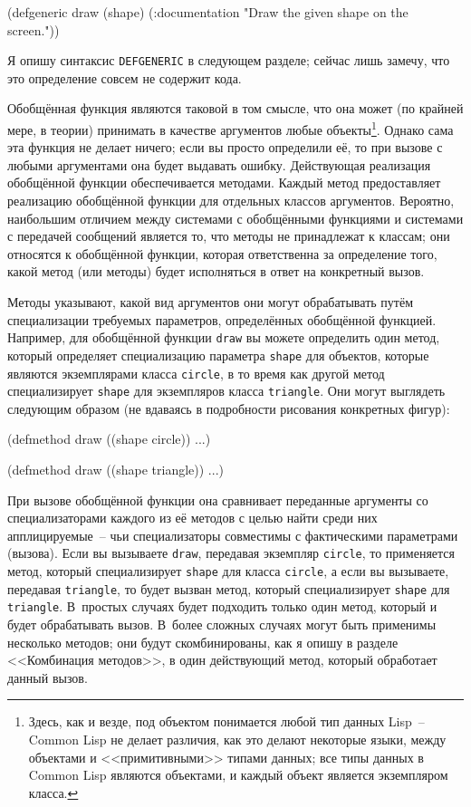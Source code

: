 \begin{myverb}
(defgeneric draw (shape)
  (:documentation "Draw the given shape on the screen."))
\end{myverb}

Я опишу синтаксис \lstinline{DEFGENERIC} в следующем разделе; сейчас лишь замечу, что это
определение совсем не содержит кода.

Обобщённая функция являются таковой в том смысле, что она может (по крайней мере, в теории)
принимать в качестве аргументов любые объекты\footnote{Здесь, как и везде, под объектом
  понимается любой тип данных Lisp~-- Common Lisp не делает различия, как это делают
  некоторые языки, между объектами и <<примитивными>> типами данных; все типы данных в
  Common Lisp являются объектами, и каждый объект является экземпляром класса.}.  Однако
сама эта функция не делает ничего; если вы просто определили её, то при вызове с любыми
аргументами она будет выдавать ошибку. Действующая реализация обобщённой функции
обеспечивается методами. Каждый метод предоставляет реализацию обобщённой функции для
отдельных классов аргументов.  Вероятно, наибольшим отличием между системами с обобщёнными
функциями и системами с передачей сообщений является то, что методы не принадлежат к
классам; они относятся к обобщённой функции, которая ответственна за определение того,
какой метод (или методы) будет исполняться в ответ на конкретный вызов.

Методы указывают, какой вид аргументов они могут обрабатывать путём специализации
требуемых параметров, определённых обобщённой функцией.  Например, для обобщённой функции
\lstinline{draw} вы можете определить один метод, который определяет специализацию параметра
\lstinline{shape} для объектов, которые являются экземплярами класса \lstinline{circle}, в то время
как другой метод специализирует \lstinline{shape} для экземпляров класса \lstinline{triangle}.  Они
могут выглядеть следующим образом (не вдаваясь в подробности рисования конкретных фигур):

\begin{myverb}
(defmethod draw ((shape circle))
  ...)

(defmethod draw ((shape triangle))
  ...)
\end{myverb}

При вызове обобщённой функции она сравнивает переданные аргументы со спе\-циа\-ли\-за\-то\-ра\-ми
каждого из её методов с целью найти среди них апплицируемые~-- чьи специализаторы
совместимы с фактическими параметрами (вызова). Если вы вы\-зы\-вае\-те \lstinline{draw}, передавая
экземпляр \lstinline{circle}, то применяется метод, который специализирует \lstinline{shape} для
класса \lstinline{circle}, а если вы вызываете, передавая \lstinline{triangle}, то будет вызван
метод, который специализирует \lstinline{shape} для \lstinline{triangle}.  В~простых случаях будет
подходить только один метод, который и будет обрабатывать вызов.  В~более сложных случаях
могут быть применимы несколько методов; они будут скомбинированы, как я опишу в разделе
<<Комбинация методов>>, в один действующий метод, который обработает данный вызов.

